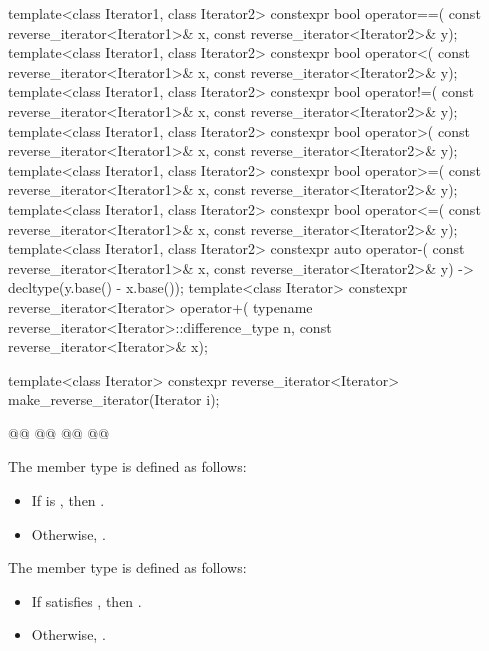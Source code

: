 \begin{codeblock}
{  template<class Iterator1, class Iterator2>
    constexpr bool operator==(
      const reverse_iterator<Iterator1>& x,
      const reverse_iterator<Iterator2>& y);
  template<class Iterator1, class Iterator2>
    constexpr bool operator<(
      const reverse_iterator<Iterator1>& x,
      const reverse_iterator<Iterator2>& y);
  template<class Iterator1, class Iterator2>
    constexpr bool operator!=(
      const reverse_iterator<Iterator1>& x,
      const reverse_iterator<Iterator2>& y);
  template<class Iterator1, class Iterator2>
    constexpr bool operator>(
      const reverse_iterator<Iterator1>& x,
      const reverse_iterator<Iterator2>& y);
  template<class Iterator1, class Iterator2>
    constexpr bool operator>=(
      const reverse_iterator<Iterator1>& x,
      const reverse_iterator<Iterator2>& y);
  template<class Iterator1, class Iterator2>
    constexpr bool operator<=(
      const reverse_iterator<Iterator1>& x,
      const reverse_iterator<Iterator2>& y);
  template<class Iterator1, class Iterator2>
    constexpr auto operator-(
      const reverse_iterator<Iterator1>& x,
      const reverse_iterator<Iterator2>& y) -> decltype(y.base() - x.base());
  template<class Iterator>
    constexpr reverse_iterator<Iterator> operator+(
      typename reverse_iterator<Iterator>::difference_type n,
      const reverse_iterator<Iterator>& x);

  template<class Iterator>
    constexpr reverse_iterator<Iterator> make_reverse_iterator(Iterator i);

  @@
    @@
  @@
                                        @@
}
\end{codeblock}

\begin{addedblock}
\pnum
The member type  is defined as follows:
\begin{itemize}
\item If  is
, then .
\item Otherwise, .
\end{itemize}

\pnum
The member type  is defined as follows:
\begin{itemize}
\item If  satisfies , then
.
\item Otherwise, .
\end{itemize}
\end{addedblock}


